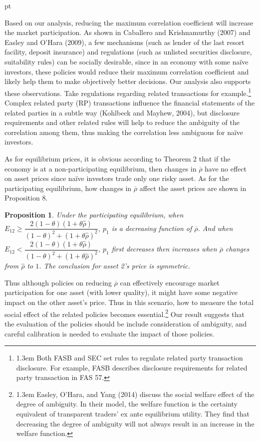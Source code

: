 \documentclass[10pt]{article}
\newtheorem{prop}{Proposition}
\begin{document}
 pt

Based on our analysis, reducing the maximum correlation coefficient will increase the market participation. As shown in Caballero and Krishnamurthy (2007) and Easley and O'Hara (2009), a few mechanisms (such as lender of the last resort facility, deposit insurance) and regulations (such as unlisted securities disclosure, suitability rules) can be socially desirable, since in an economy with some na\"ive investors, these policies would reduce their maximum correlation coefficient and likely help them to make objectively better decisions. Our analysis also supports these observations. Take regulations regarding related transactions for example.\footnote{\baselineskip1.3em Both FASB and SEC set rules to regulate related party transaction disclosure. For example, FASB describes disclosure requirements for related party transaction in FAS 57.} Complex related party (RP) transactions influence the financial statements of the related parties in a subtle way (Kohlbeck and Mayhew, 2004), but disclosure requirements and other related rules will help to reduce the ambiguity of the correlation among them, thus making the correlation less ambiguous for na\"ive investors. 

As for equilibrium prices, it is obvious according to Theorem 2 that if the economy is at a non-participating equilibrium, then changes in $ \overline{\rho} $ have no effect on asset prices since na\"ive investors trade only one risky asset. As for the participating equilibrium, how changes in $ \overline{\rho} $ affect the asset prices are shown in Proposition 8.

\begin{prop}
Under the participating equilibrium, when $ E_{1 2} \geqslant \dfrac{2 (1 - \theta) (1 + \theta \hat{\rho})}{(1 - \theta)^2 + (1 + \theta\hat{\rho})^2} $, $ p_1 $ is a decreasing function of $ \overline{\rho} $. And when $ E_{1 2} < \dfrac{2 (1 - \theta) (1 + \theta \hat{\rho})}{(1 - \theta)^2 + (1 + \theta\hat{\rho})^2} $, $ p_1 $ first decreases then increases when $ \overline{\rho} $ changes from $ \hat{\rho} $ to $1$. The conclusion for asset 2's price is symmetric. 
\end{prop}

Thus although policies on reducing $ \overline{\rho} $ can effectively encourage market participation for one asset (with lower quality), it might have some negative impact on the other asset's price. Thus in this scenario, how to measure the total social effect of the related policies becomes essential.\footnote{\baselineskip1.3em Easley, O'Hara, and Yang (2014) discuss the social welfare effect of the degree of ambiguity. In their model, the welfare function is the certainty equivalent of transparent traders' ex ante equilibrium utility. They find that decreasing the degree of ambiguity will not always result in an increase in the welfare function.} Our result suggests that the evaluation of the policies should be include consideration of ambiguity, and careful calibration is needed to evaluate the impact of those policies.  
\end{document}
